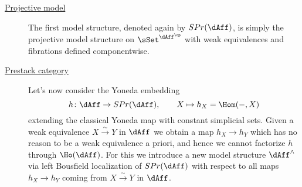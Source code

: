         \begin{description}
            \item[\underline{Projective model}] \label{description:projective_structure} The first model structure, denoted again by $SPr(\dAff)$, is simply the projective model structure on $\sSet^{\dAff^{\op}}$ with weak equivalences and fibrations defined componentwise.
        
            \item[\underline{Prestack category}] \label{description:prestack_category} Let's now consider the Yoneda embedding \[h\colon \dAff \to SPr(\dAff), \qquad X \mapsto h_X = \Hom(-, X) \] extending the classical Yoneda map with constant simplicial sets. Given a weak equivalence $X \stackrel{\sim}{\to} Y$ in $\dAff$ we obtain a map $h_X \to h_Y$ which has no reason to be a weak equivalence a priori, and hence we cannot factorize $h$ through $\Ho(\dAff)$. For this we introduce a new model structure $\dAff^{\wedge}$ via left Bousfield localization of $SPr(\dAff)$ with respect to all maps $h_X \to h_Y$ coming from $X \stackrel{\sim}{\to} Y$ in $\dAff$. 
            

\end{description}
